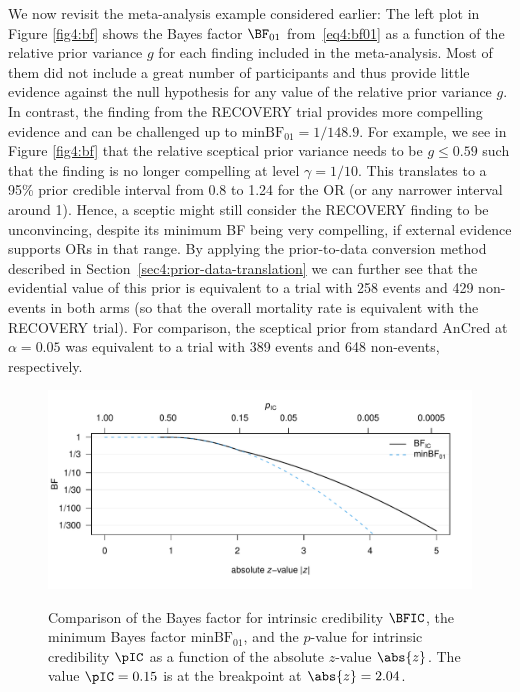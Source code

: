 We now revisit the meta-analysis example considered earlier: The left plot in
Figure \ref{fig4:bf} shows the Bayes factor $\BF_{01}$ from~\eqref{eq4:bf01} as
a function of the relative prior variance $g$ for each finding included in the
meta-analysis. Most of them did not include a great number of participants and
thus provide little evidence against the null hypothesis for any value of the
relative prior variance $g$. In contrast, the finding from the RECOVERY trial
provides more compelling evidence and can be challenged up to
$\text{minBF}_{01} = 1/148.9$. For example, we see in Figure \ref{fig4:bf} that
the relative sceptical prior variance needs to be $g \leq 0.59$ such that the
finding is no longer compelling at level $\gamma = 1/10$. This translates to a
95\% prior credible interval from 0.8 to 1.24 for the OR (or any narrower
interval around 1). Hence, a sceptic might still consider the RECOVERY finding
to be unconvincing, despite its minimum BF being very compelling, if external
evidence supports ORs in that range. By applying the prior-to-data conversion
method described in Section~\ref{sec4:prior-data-translation} we can further see
that the evidential value of this prior is equivalent to a trial with 258 events
and 429 non-events in both arms (so that the overall mortality rate is
equivalent with the RECOVERY trial). For comparison, the sceptical prior from
standard AnCred at $\alpha = 0.05$ was equivalent to a trial with 389 events and
648 non-events, respectively.

\begin{figure}[!htb]
\begin{knitrout}
\color{fgcolor}
{\centering \includegraphics[width=\maxwidth]{images/paper4/example5-RECOVERY-1}
}
\end{knitrout}
\caption{Comparison of the Bayes factor for intrinsic credibility $\BFIC$, the
  minimum Bayes factor $\mbox{minBF}_{01}$, and the $p$-value for intrinsic
  credibility $\pIC$ as a function of the absolute $z$-value $\abs{z}$. The
  value $\pIC = 0.15$ is at the breakpoint at $\abs{z} = 2.04$.}
\label{fig4:bfic}
\end{figure}

